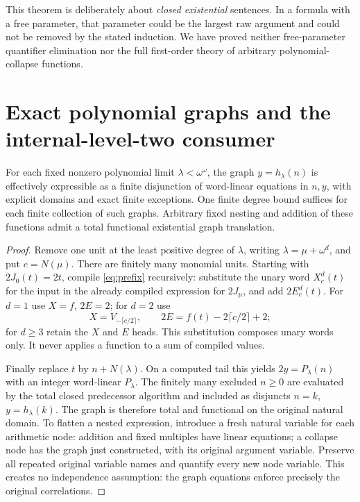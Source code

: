 \documentclass[11pt]{article}
\begin{document}
This theorem is deliberately about \emph{closed existential} sentences.
In a formula with a free parameter, that parameter could be the largest raw
argument and could not be removed by the stated induction. We have proved
neither free-parameter quantifier elimination nor the full first-order
theory of arbitrary polynomial-collapse functions.

\section{Exact polynomial graphs and the internal-level-two consumer}
\begin{theorem}\label{thm:graphs}
For each fixed nonzero polynomial limit $\lambda<\omega^\omega$, the graph
$y=h_\lambda(n)$ is effectively expressible as a finite disjunction of
word-linear equations in $n,y$, with explicit domains and exact finite
exceptions. One finite degree bound suffices for each finite collection of
such graphs. Arbitrary fixed nesting and addition of these functions admit
a total functional existential graph translation.
\end{theorem}
\begin{proof}
Remove one unit at the least positive degree of $\lambda$, writing
$\lambda=\mu+\omega^d$, and put $c=N(\mu)$. There are finitely many
monomial units. Starting with $2J_0(t)=2t$, compile \eqref{eq:prefix}
recursively: substitute the unary word $X^d_c(t)$ for the input in the
already compiled expression for $2J_\mu$, and add $2E^d_c(t)$. For $d=1$
use $X=f$, $2E=2$; for $d=2$ use
\[
 X=V_{-\lceil c/2\rceil},\qquad
 2E=f(t)-2\lceil c/2\rceil+2;
\]
for $d\ge3$ retain the $X$ and $E$ heads. This substitution composes unary
words only. It never applies a function to a sum of compiled values.

Finally replace $t$ by $n+N(\lambda)$. On a computed tail this yields
$2y=P_\lambda(n)$ with an integer word-linear $P_\lambda$. The finitely
many excluded $n\ge0$ are evaluated by the total closed predecessor
algorithm and included as disjuncts $n=k$, $y=h_\lambda(k)$. The graph is
therefore total and functional on the original natural domain.
To flatten a nested expression, introduce a fresh natural variable for
each arithmetic node: addition and fixed multiples have linear equations;
a collapse node has the graph just constructed, with its original argument
variable. Preserve all repeated original variable names and quantify every
new node variable. This creates no independence assumption: the graph
equations enforce precisely the original correlations.
\end{proof}
\end{document}
